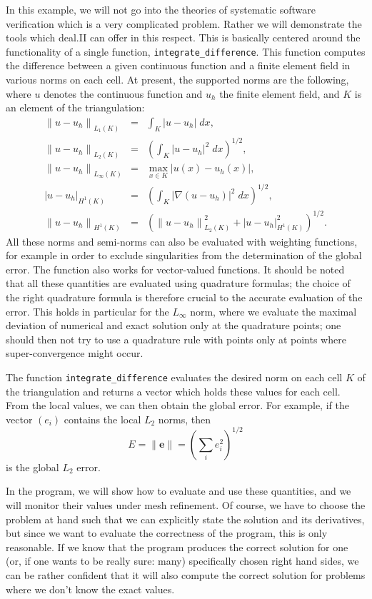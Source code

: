 \documentclass{article}
\begin{document}
In this example, we will not go into the theories of systematic software
verification which is a very complicated problem. Rather we will demonstrate
the tools which deal.II can offer in this respect. This is basically centered
around the functionality of a single function, \texttt{integrate\_difference}.
This function computes the difference between a given continuous function and
a finite element field in various norms on each cell. At present, the
supported norms are the following, where $u$ denotes the continuous function
and $u_h$ the finite element field, and $K$ is an element of the
triangulation:
\begin{eqnarray*}
  {\| u-u_h \|}_{L_1(K)} &=& \int_K |u-u_h| \; dx,
  \\
  {\| u-u_h \|}_{L_2(K)} &=& \left( \int_K |u-u_h|^2 \; dx \right)^{1/2},
  \\
  {\| u-u_h \|}_{L_\infty(K)} &=& \max_{x  \in K} |u(x) - u_h(x)|,
  \\
  {| u-u_h |}_{H^1(K)} &=& \left( \int_K |\nabla(u-u_h)|^2 \; dx \right)^{1/2},
  \\
  {\| u-u_h \|}_{H^1(K)} &=& \left( {\| u-u_h \|}^2_{L_2(K)} 
                                   +{| u-u_h |}^2_{H^1(K)}    \right)^{1/2}.
\end{eqnarray*}
All these norms and semi-norms can also be evaluated with weighting functions,
for example in order to exclude singularities from the determination of the
global error. The function also works for vector-valued functions.  It should
be noted that all these quantities are evaluated using quadrature formulas;
the choice of the right quadrature formula is therefore crucial to the
accurate evaluation of the error. This holds in particular for the $L_\infty$
norm, where we evaluate the maximal deviation of numerical and exact solution
only at the quadrature points; one should then not try to use a quadrature
rule with points only at points where super-convergence might occur.

The function \texttt{integrate\_difference} evaluates the desired norm on each
cell $K$ of the triangulation and returns a vector which holds these
values for each cell. From the local values, we can then obtain the global error. For
example, if the vector $(e_i)$ contains the local $L_2$ norms, then
$$
  E = \| {\mathbf e} \| = \left( \sum_i e_i^2 \right)^{1/2}
$$
is the global $L_2$ error.

In the program, we will show how to evaluate and use these quantities, and we
will monitor their values under mesh refinement. Of course, we have to choose
the problem at hand such that we can explicitly state the solution and its
derivatives, but since we want to evaluate the correctness of the program,
this is only reasonable. If we know that the program produces the correct
solution for one (or, if one wants to be really sure: many) specifically
chosen right hand sides, we can be rather confident that it will also compute
the correct solution for problems where we don't know the exact values.
\end{document}
